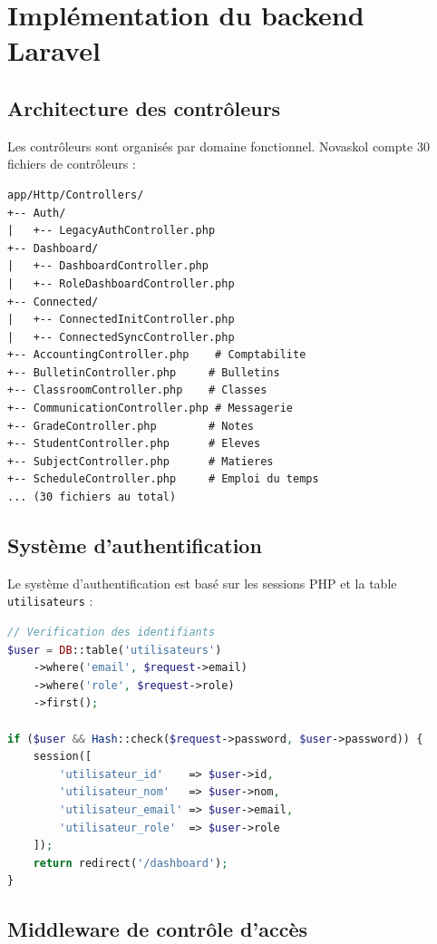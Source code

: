 \documentclass[12pt,a4paper,twoside]{report}
\begin{document}
\section{Implémentation du backend Laravel}

\subsection{Architecture des contrôleurs}

Les contrôleurs sont organisés par domaine fonctionnel. Novaskol compte 30 fichiers de contrôleurs :

\begin{verbatim}
app/Http/Controllers/
+-- Auth/
|   +-- LegacyAuthController.php
+-- Dashboard/
|   +-- DashboardController.php
|   +-- RoleDashboardController.php
+-- Connected/
|   +-- ConnectedInitController.php
|   +-- ConnectedSyncController.php
+-- AccountingController.php    # Comptabilite
+-- BulletinController.php     # Bulletins
+-- ClassroomController.php    # Classes
+-- CommunicationController.php # Messagerie
+-- GradeController.php        # Notes
+-- StudentController.php      # Eleves
+-- SubjectController.php      # Matieres
+-- ScheduleController.php     # Emploi du temps
... (30 fichiers au total)
\end{verbatim}

\subsection{Système d'authentification}

Le système d'authentification est basé sur les sessions PHP et la table \texttt{utilisateurs} :

\begin{lstlisting}[language=PHP]
// Verification des identifiants
$user = DB::table('utilisateurs')
    ->where('email', $request->email)
    ->where('role', $request->role)
    ->first();

if ($user && Hash::check($request->password, $user->password)) {
    session([
        'utilisateur_id'    => $user->id,
        'utilisateur_nom'   => $user->nom,
        'utilisateur_email' => $user->email,
        'utilisateur_role'  => $user->role
    ]);
    return redirect('/dashboard');
}
\end{lstlisting}

\subsection{Middleware de contrôle d'accès}
\end{document}
